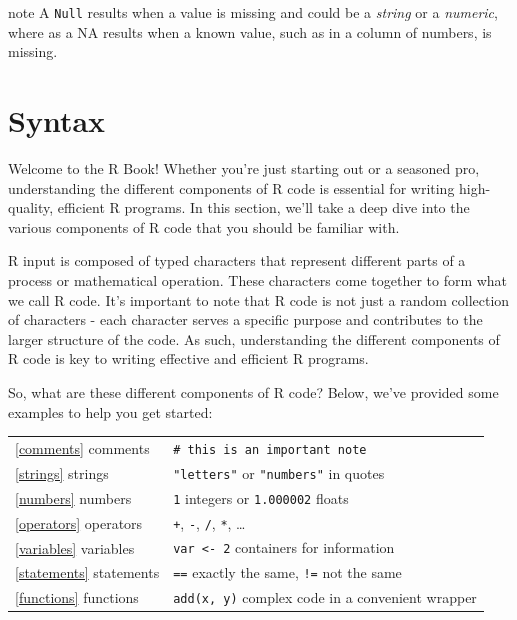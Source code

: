 \documentclass[
]{book}
\begin{document}
\begin{infobox}{note}
A \texttt{Null} results when a value is missing and could be a \emph{string} or a \emph{numeric}, where as a NA results when a known value, such as in a column of numbers, is missing.

\end{infobox}

\hypertarget{syntax}{%
\section{Syntax}\label{syntax}}

Welcome to the R Book! Whether you're just starting out or a seasoned pro, understanding the different components of R code is essential for writing high-quality, efficient R programs. In this section, we'll take a deep dive into the various components of R code that you should be familiar with.

R input is composed of typed characters that represent different parts of a process or mathematical operation. These characters come together to form what we call R code. It's important to note that R code is not just a random collection of characters - each character serves a specific purpose and contributes to the larger structure of the code. As such, understanding the different components of R code is key to writing effective and efficient R programs.

So, what are these different components of R code? Below, we've provided some examples to help you get started:

\begin{longtable}[]{@{}
  >{\raggedright\arraybackslash}p{}
  >{\raggedright\arraybackslash}p{}@{}}
\toprule\noalign{}
\endhead
\bottomrule\noalign{}
\endlastfoot
\ref{comments} comments & \texttt{\#\ this\ is\ an\ important\ note} \\
\ref{strings} strings & \texttt{"letters"} or \texttt{"numbers"} in quotes \\
\ref{numbers} numbers & \texttt{1} integers or \texttt{1.000002} floats \\
\ref{operators} operators & \texttt{+}, \texttt{-}, \texttt{/}, \texttt{*}, \ldots{} \\
\ref{variables} variables & \texttt{var\ \textless{}-\ 2} containers for information \\
\ref{statements} statements & \texttt{==} exactly the same, \texttt{!=} not the same \\
\ref{functions} functions & \texttt{add(x,\ y)} complex code in a convenient wrapper \\
\end{longtable}
\end{document}
